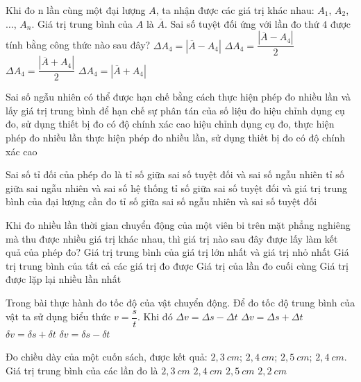 \begin{ex}%
Khi đo n lần cùng một đại lượng $A$, ta nhận được các giá trị khác nhau: $A_1$, $A_2$, $\ldots$, $A_{n}$. Giá trị trung bình của $A$ là $\overline{A}$. Sai số tuyệt đối ứng với lần đo thứ $4$ được tính bằng công thức nào sau đây?
\choice
{\True $\Delta A_4=\left|\overline{A}-A_4\right|$}
{$\Delta A_4=\dfrac{\left|\overline{A}-A_4\right|}{2}$}
{$\Delta A_4=\dfrac{\left|\overline{A}+A_4\right|}{2}$}
{$\Delta A_4=\left|\overline{A}+A_4\right|$}
\loigiai{
}
\end{ex}
\begin{ex}%
Sai số ngẫu nhiên có thể được hạn chế bằng cách
\choice
{\True thực hiện phép đo nhiều lần và lấy giá trị trung bình để hạn chế sự phân tán của số liệu đo}
{hiệu chỉnh dụng cụ đo, sử dụng thiết bị đo có độ chính xác cao}
{hiệu chỉnh dụng cụ đo, thực hiện phép đo nhiều lần}
{thực hiện phép đo nhiều lần, sử dụng thiết bị đo có độ chính xác cao}
\loigiai{
}
\end{ex}
\begin{ex}%
Sai số tỉ đối của phép đo là
\choice
{tỉ số giữa sai số tuyệt đối và sai số ngẫu nhiên}
{tỉ số giữa sai ngẫu nhiên và sai số hệ thống}
{\True tỉ số giữa sai số tuyệt đối và giá trị trung bình của đại lượng cần đo}
{tỉ số giữa sai số ngẫu nhiên và sai số tuyệt đối}
\loigiai{
}
\end{ex}
\begin{ex}%
Khi đo nhiều lần thời gian chuyển động của một viên bi trên mặt phẳng nghiêng mà thu được nhiều giá trị khác nhau, thì giá trị nào sau đây được lấy làm kết quả của phép đo?
\choice
{Giá trị trung bình của giá trị lớn nhất và giá trị nhỏ nhất}
{\True Giá trị trung bình của tất cả các giá trị đo được}
{Giá trị của lần đo cuối cùng}
{Giá trị được lặp lại nhiều lần nhất}

\loigiai{
}
\end{ex}
\begin{ex}%
Trong bài thực hành đo tốc độ của vật chuyển động. Để đo tốc độ trung bình của vật ta sử dụng biểu thức $v=\dfrac{s}{t}$. Khi đó
\choice
{$\Delta v=\Delta s-\Delta t$}
{$\Delta v=\Delta s+\Delta t$}
{\True $\delta v=\delta s+\delta t$}
{$\delta v=\delta s-\delta t$}

\loigiai{
}
\end{ex}
\begin{ex}%
Đo chiều dày của một cuốn sách, được kết quả: $2,3\ cm$; $2,4\ cm$; $2,5\ cm$; $2,4\ cm$. Giá trị trung bình của các lần đo là
\choice
{$2,3\ cm$}
{\True $2,4\ cm$}
{$2,5\ cm$}
{$2,2\ cm$}
\loigiai{
}
\end{ex}
